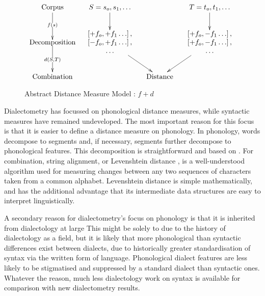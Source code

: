 \documentclass[11pt]{article}
\begin{document}
\begin{figure}
\[\xymatrix@C=1pc{
 \textrm{Corpus} \ar@{>}[d]|{f(s)} &
  S = s_o,s_1,\ldots
  \ar@{>}[d] %
  &&
  T = t_o,t_1,\ldots
  \ar@{>}[d] %
  \\
 *\txt{Decomposition} \ar@{>}[d]|{d(S,T)} &
 *{\begin{array}{c}
     \left[ + f_o, +f_1 \ldots \right], \\
     \left[ - f_o, +f_1 \ldots \right], \\
     \ldots \\ \end{array}}
 \ar@{>}[dr]
 &&
 *{\begin{array}{c}
     \left[ + f_o, -f_1 \ldots \right], \\
     \left[ + f_o, -f_1 \ldots \right], \\
     \ldots \\ \end{array}}
 \ar@{>}[dl]  \\
 \textrm{Combination} &
 & \textrm{Distance} & \\
} \]
\label{abstract-distance-measure-model}
\caption{Abstract Distance Measure Model : $f + d$}
\end{figure}

Dialectometry has focussed on phonological distance measures, while
syntactic measures have remained undeveloped. The most important
reason for this focus is that it is easier to define a distance
measure on phonology. In phonology, words decompose to segments and,
if necessary, segments further decompose to phonological
features. This decomposition is straightforward and based on
. For combination, string alignment, or Levenshtein
distance \cite{lev65}, is a well-understood algorithm used for
measuring changes between any two sequences of characters taken from a
common alphabet. Levenshtein distance is simple mathematically, and
has the additional advantage that its intermediate data structures are
easy to interpret linguistically.

A secondary reason for dialectometry's focus on phonology is that it
is inherited from dialectology at large
This might be solely to due to the history of dialectology as a field, but it is
likely that more phonological than syntactic differences exist between
dialects, due to historically greater standardisation
of syntax via the written form of language. Phonological
dialect features are less likely to be stigmatised and suppressed by a
standard dialect than syntactic ones.
Whatever the reason, much less dialectology work on syntax is
available for comparison with new dialectometry results.
\end{document}
